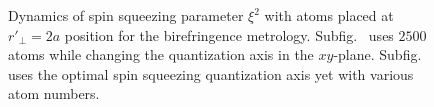 \documentclass[preprint,aps,pra,onecolumn]{revtex4-1} %
\begin{document}
\begin{figure}
\begin{minipage}{.49\linewidth}
\centering
{}
\end{minipage}
\begin{minipage}{.49\linewidth}
\centering
{}
\end{minipage}
\caption{Dynamics of spin squeezing parameter $ \xi^2 $ with atoms placed at $ r'\!_\perp=2a $ position for the birefringence metrology. Subfig.~\protect{} uses $ 2500 $ atoms while changing the quantization axis in the $ xy $-plane. Subfig.~\protect{} uses the optimal spin squeezing quantization axis yet with various atom numbers. }\label{fig:xit_r2a}
\end{figure}
\end{document}
